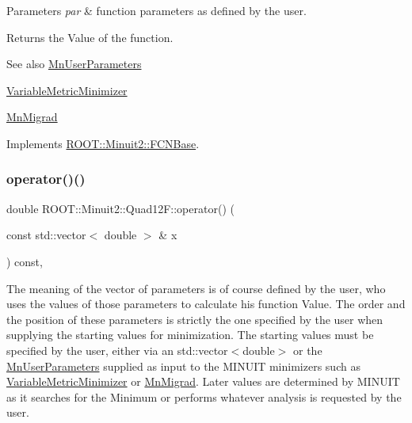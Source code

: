 \begin{DoxyParams}{Parameters}
{\em par} & function parameters as defined by the user.\\
\hline
\end{DoxyParams}
\begin{DoxyReturn}{Returns}
the Value of the function.
\end{DoxyReturn}
\begin{DoxySeeAlso}{See also}
\mbox{\hyperlink{classROOT_1_1Minuit2_1_1MnUserParameters}{Mn\+User\+Parameters}} 

\mbox{\hyperlink{classROOT_1_1Minuit2_1_1VariableMetricMinimizer}{Variable\+Metric\+Minimizer}} 

\mbox{\hyperlink{classROOT_1_1Minuit2_1_1MnMigrad}{Mn\+Migrad}} 
\end{DoxySeeAlso}


Implements \mbox{\hyperlink{classROOT_1_1Minuit2_1_1FCNBase_ae4a86bd94d0d0f5ca6fc8f8ab2bb43cd}{R\+O\+O\+T\+::\+Minuit2\+::\+F\+C\+N\+Base}}.

\mbox{\label{classROOT_1_1Minuit2_1_1Quad12F_ad68fa5e48b2de950139a1e73a5a0558b}} 
\subsubsection{\texorpdfstring{operator()()}{operator()()}\hspace{0.1cm}{\footnotesize\ttfamily [2/2]}}
{\footnotesize\ttfamily double R\+O\+O\+T\+::\+Minuit2\+::\+Quad12\+F\+::operator() (\begin{DoxyParamCaption}\item[{const std\+::vector$<$ double $>$ \&}]{x }\end{DoxyParamCaption}) const\hspace{0.3cm}{\ttfamily [inline]}, {\ttfamily [virtual]}}

The meaning of the vector of parameters is of course defined by the user, who uses the values of those parameters to calculate his function Value. The order and the position of these parameters is strictly the one specified by the user when supplying the starting values for minimization. The starting values must be specified by the user, either via an std\+::vector$<$double$>$ or the \mbox{\hyperlink{classROOT_1_1Minuit2_1_1MnUserParameters}{Mn\+User\+Parameters}} supplied as input to the M\+I\+N\+U\+IT minimizers such as \mbox{\hyperlink{classROOT_1_1Minuit2_1_1VariableMetricMinimizer}{Variable\+Metric\+Minimizer}} or \mbox{\hyperlink{classROOT_1_1Minuit2_1_1MnMigrad}{Mn\+Migrad}}. Later values are determined by M\+I\+N\+U\+IT as it searches for the Minimum or performs whatever analysis is requested by the user.


